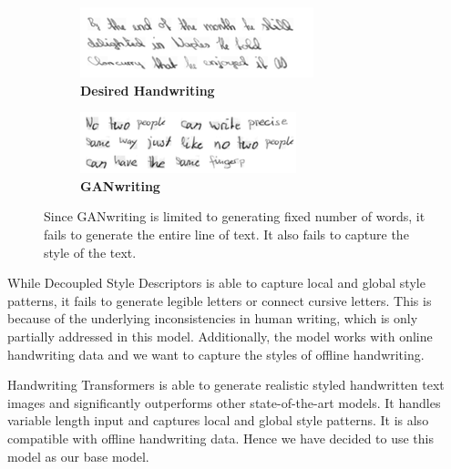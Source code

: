 \documentclass[10pt,twocolumn,letterpaper]{article}
\begin{document}
\begin{figure}[h]
  \centering
  \begin{subfigure}[b]{0.45\textwidth}
    \includegraphics[width=\textwidth]{../latex-src/Images/Gan-Input1.png}
    \caption{\textbf{Desired Handwriting}}
    \label{fig:GAN-input}
  \end{subfigure}
  \hfill
  \begin{subfigure}[b]{0.45\textwidth}
    \includegraphics[width=\textwidth]{../latex-src/Images/Gan-Output1.png}
    \caption{\textbf{GANwriting}}
    \label{fig:GAN-output}
  \end{subfigure}
  \caption{{Since GANwriting is limited to generating fixed number of words, it fails to generate the entire line of text. It also fails to capture the style of the text.}}
  \label{fig:GAN}
\end{figure}

While Decoupled Style Descriptors \cite{BRUSH-paper} is able to capture local and global style patterns, it fails to generate legible letters or connect cursive letters. This is because of the underlying inconsistencies in human writing, which is only partially addressed in this model. Additionally, the model works with online handwriting data and we want to capture the styles of offline handwriting.

Handwriting Transformers \cite{HWT} is able to generate realistic styled handwritten text images and significantly outperforms other state-of-the-art models. It handles variable length input and captures local and global style patterns. It is also compatible with offline handwriting data. Hence we have decided to use this model as our base model.\\
\end{document}
